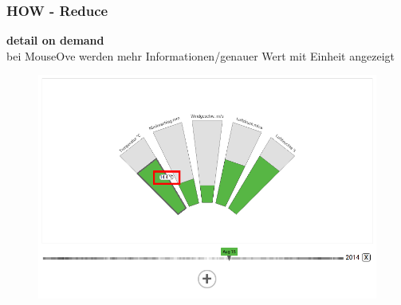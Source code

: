 \documentclass{beamer}
\begin{document}
  \begin{frame}
  \frametitle{HOW - Reduce}
    \textbf{detail on demand}
    \\ bei MouseOve werden mehr Informationen/genauer Wert mit Einheit angezeigt
    \begin{figure}[h]
      \centering
      \includegraphics[width=.6\paperwidth,keepaspectratio=true]{./media/detail_on_demand.png}
    \end{figure}
  \end{frame}


  
\end{document}
